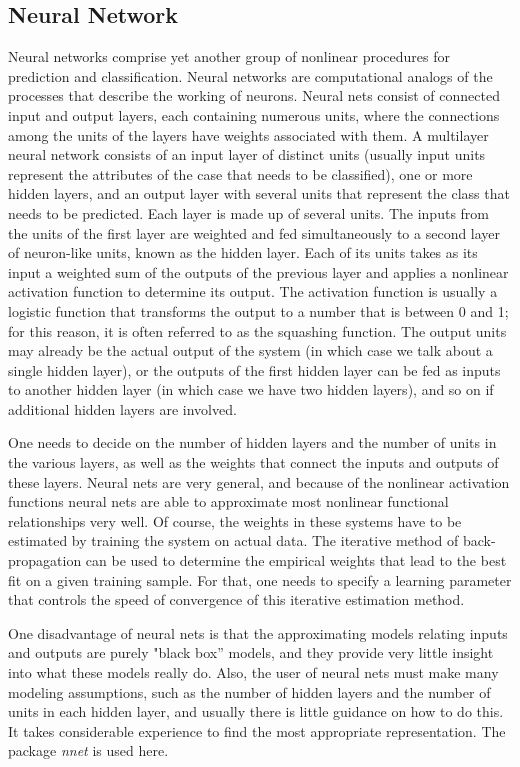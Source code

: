 \documentclass{article}\usepackage[]{graphicx}\usepackage[]{color}
\begin{document}
\subsection{Neural Network}\hspace{0.9cm}Neural networks comprise yet another group of nonlinear procedures for prediction and classification. Neural networks are computational analogs of the processes that describe the working of neurons. Neural nets consist of connected input and output layers, each containing numerous units, where the connections among the units of the layers have weights associated with them. A multilayer neural network consists of an input layer of distinct units (usually input units represent the attributes of the case that needs to be classified), one or more hidden layers, and an output layer with several units that represent the class that needs to be predicted. Each layer is made up of several units. The inputs from the units of the first layer are weighted and fed simultaneously to a second layer of neuron-like units, known as the hidden layer. Each of its units takes as its input a weighted sum of the outputs
of the previous layer and applies a nonlinear activation function to determine its output. The activation function is usually a logistic function that transforms the output to a number that is between 0 and 1; for this reason, it is often referred to as the squashing function. The output units may already be the actual output of the system (in which case we talk about a single hidden layer), or the outputs of the
first hidden layer can be fed as inputs to another hidden layer (in which case we have two hidden layers), and so on if additional hidden layers are involved.\par
\hspace{0.5cm} One needs to decide on the number of hidden layers and the number of units in the various layers, as well as the weights that connect the inputs and outputs of these layers. Neural nets are very general, and because of the nonlinear activation functions neural nets are able to approximate most nonlinear functional relationships very well. Of course, the weights in these systems have to be estimated by training the system on actual data. The iterative method of back-propagation can be used to determine the empirical weights that lead to the best fit on a given training sample. For that, one needs to specify a learning parameter that controls the speed of convergence of this iterative estimation method.\par
\hspace{0.5cm} One disadvantage of neural nets is that the approximating models relating inputs and outputs are purely "black box'' models, and they provide very little insight into what these models really do. Also, the user of neural nets must make many modeling assumptions, such as the number of hidden layers and the number of units in each hidden layer, and usually there is little guidance on how to do this. It takes considerable experience to find the most appropriate representation. The package \textit{nnet} is used here\cite{[7]}.\par
\end{document}

